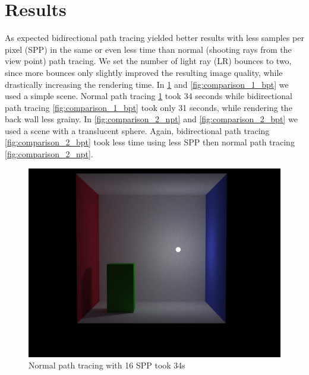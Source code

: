 \section{Results}
As expected bidirectional path tracing yielded better results with less samples per pixel (SPP) in the same or even less time than normal (shooting rays from the view point) path tracing. We set the number of light ray (LR) bounces to two, since more bounces only slightly improved the resulting image quality, while drastically increasing the rendering time. In \ref{fig:comparison_1_npt} and \ref{fig:comparison_1_bpt} we used a simple scene. Normal path tracing \ref{fig:comparison_1_npt} took 34 seconds while bidirectional path tracing \ref{fig:comparison_1_bpt} took only 31 seconds, while rendering the back wall less grainy. In \ref{fig:comparison_2_npt} and \ref{fig:comparison_2_bpt} we used a scene with a translucent sphere. Again, bidirectional path tracing \ref{fig:comparison_2_bpt} took less time using less SPP then normal path tracing \ref{fig:comparison_2_npt}.

\begin{figure}[htbp]
  \centering
     \includegraphics[width=\textwidth]{pics/1_normal_pt_16spp_34s.jpg}
  \caption{Normal path tracing with 16 SPP took 34s}
  \label{fig:comparison_1_npt}
\end{figure}

